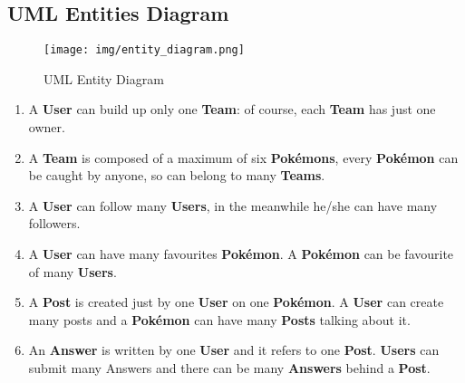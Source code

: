 \subsection{UML Entities Diagram}
\begin{figure}[H]
	\centering
	\texttt{[image: img/entity\_diagram.png]}
	\caption{UML Entity Diagram}
\end{figure}
\begin{enumerate}
	\item A \textbf{User} can build up only one \textbf{Team}: of course, each \textbf{Team} has just one owner.
	\item A \textbf{Team} is composed of a maximum of six \textbf{Pokémons}, every \textbf{Pokémon} can be caught by anyone, so can belong to many \textbf{Teams}.
	\item A \textbf{User} can follow many \textbf{Users}, in the meanwhile he/she can have many followers.
	\item A \textbf{User} can have many favourites \textbf{Pokémon}. A \textbf{Pokémon} can be favourite of many \textbf{Users}.
	\item A \textbf{Post} is created just by one \textbf{User} on one \textbf{Pokémon}. A \textbf{User} can create many posts and a \textbf{Pokémon} can have many \textbf{Posts} talking about it.
	\item An \textbf{Answer} is written by one \textbf{User} and it refers to one \textbf{Post}. \textbf{Users} can submit many Answers and there can be many \textbf{Answers} behind a \textbf{Post}.
\end{enumerate}

